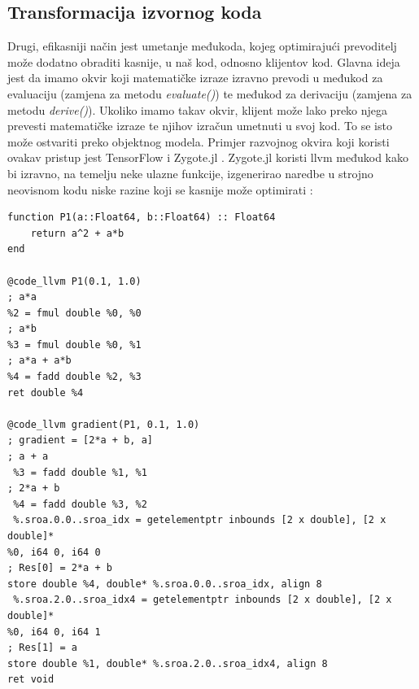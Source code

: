 \documentclass[zavrsnirad]{fer}
\begin{document}
\subsection{Transformacija izvornog koda}

Drugi, efikasniji način jest umetanje međukoda, kojeg optimirajući prevoditelj može dodatno obraditi kasnije, u naš kod, odnosno klijentov kod. Glavna ideja jest da imamo okvir koji matematičke izraze izravno prevodi u međukod za evaluaciju (zamjena za metodu \textit{evaluate()}) te međukod za derivaciju (zamjena za metodu \textit{derive()}). Ukoliko imamo takav okvir, klijent može lako preko njega prevesti matematičke izraze te njihov izračun umetnuti u svoj kod. To se isto može ostvariti preko objektnog modela. Primjer razvojnog okvira koji koristi ovakav pristup jest TensorFlow \cite{tensorflow} i Zygote.jl \cite{prague:diffcpp}. Zygote.jl koristi llvm međukod kako bi izravno, na temelju neke ulazne funkcije, izgenerirao naredbe u strojno neovisnom kodu niske razine koji se kasnije može optimirati \cite{zygote}:
\\

\begin{lstlisting}[caption={Primjer korištenja Zygote.jl za generiranje llvm međukoda za funkciju: $a^2 + a*b$ \cite{prague:diffcpp}}]
function P1(a::Float64, b::Float64) :: Float64 
    return a^2 + a*b 
end

@code_llvm P1(0.1, 1.0) 
; a*a 
%2 = fmul double %0, %0 
; a*b 
%3 = fmul double %0, %1 
; a*a + a*b 
%4 = fadd double %2, %3 
ret double %4 
 
@code_llvm gradient(P1, 0.1, 1.0) 
; gradient = [2*a + b, a] 
; a + a 
 %3 = fadd double %1, %1 
; 2*a + b 
 %4 = fadd double %3, %2 
 %.sroa.0.0..sroa_idx = getelementptr inbounds [2 x double], [2 x double]* 
%0, i64 0, i64 0 
; Res[0] = 2*a + b 
store double %4, double* %.sroa.0.0..sroa_idx, align 8 
 %.sroa.2.0..sroa_idx4 = getelementptr inbounds [2 x double], [2 x double]* 
%0, i64 0, i64 1 
; Res[1] = a  
store double %1, double* %.sroa.2.0..sroa_idx4, align 8 
ret void
\end{lstlisting}

\pagebreak
\end{document}
